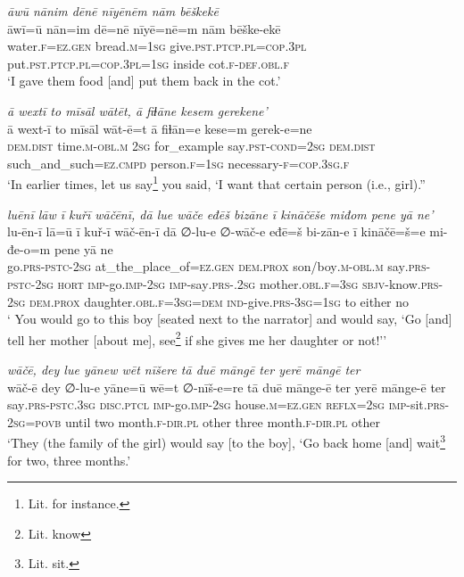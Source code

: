 \ea \label{ŽE.67}
\textit{āwū nānim dēnē nīyēnēm nām bēškekē} \\ 
\gll āwī=ū nān=im dē=nē nīyē=nē=m nām bēške-ekē \\ 
 water\textsc{.f}\textsc{\textsc{=ez.gen}} bread\textsc{.m}\textsc{=\textsc{1sg}} give\textsc{.pst}\textsc{.ptcp}\textsc{.pl}\textsc{=cop}\textsc{.3pl} put\textsc{.pst}\textsc{.ptcp}\textsc{.pl}\textsc{=cop}\textsc{.3pl}\textsc{=\textsc{1sg}} inside cot\textsc{.f}\textsc{-def}\textsc{.obl}\textsc{.f} \\ 
\glt `I gave them food [and] put them back in the cot.'
\z 
 
\ea \label{ŽE.73}
\textit{ā wextī to mīsāl wātēt, ā fiɫāne kesem gerekene’} \\ 
\gll ā wext-ī to mīsāl wāt-ē=t ā fiɫān=e kese=m gerek-e=ne \\ 
 \textsc{dem.dist} time\textsc{.m}\textsc{-obl}\textsc{.m} \textsc{2sg} for\_example say\textsc{.pst}\textsc{-cond}\textsc{=\textsc{2sg}} \textsc{dem.dist} such\_and\_such\textsc{=ez}\textsc{.cmpd} person\textsc{.f}\textsc{=\textsc{1sg}} necessary\textsc{-f}\textsc{=cop}\textsc{.3sg}\textsc{.f} \\ 
\glt `In earlier times, let us say\footnote{Lit. for instance.} you said, ‘I want that certain person (i.e., girl).''
\z 
 
\ea \label{ŽE.74}
\textit{luēnī lāw ī kuřī wāčēnī, dā lue wāče eđēš bizāne ī kināčēše miđom pene yā ne’} \\ 
\gll lu-ēn-ī lā=ū ī kuř-ī wāč-ēn-ī dā ∅-lu-e ∅-wāč-e eđē=š bi-zān-e ī kināčē=š=e mi-đe-o=m pene yā ne \\ 
 go\textsc{.prs}\textsc{-pstc}-\textsc{2sg} at\_the\_place\_of\textsc{\textsc{=ez.gen}} \textsc{dem.prox} son/boy\textsc{.m}\textsc{-obl}\textsc{.m} say\textsc{.prs}\textsc{-pstc}-\textsc{2sg} \textsc{hort} \textsc{imp-}go.\textsc{imp-}\textsc{2sg} \textsc{imp-}say\textsc{.prs-}.\textsc{2sg} mother\textsc{.obl}\textsc{.f}\textsc{=3sg} \textsc{sbjv-}know\textsc{.prs}-\textsc{2sg} \textsc{dem.prox} daughter\textsc{.obl}\textsc{.f}\textsc{=3sg}\textsc{=dem} \textsc{ind-}give\textsc{.prs}\textsc{-3sg}\textsc{=\textsc{1sg}} to either no \\ 
\glt ` You would go to this boy [seated next to the narrator] and would say, ‘Go [and] tell her mother [about me], see\footnote{Lit. know} if she gives me her daughter or not!’'
\z 
 
\ea \label{ŽE.82}
\textit{wāčē, dey lue yānew wēt nīšere tā duē māngē ter yerē māngē ter} \\ 
\gll wāč-ē dey ∅-lu-e yāne=ū wē=t ∅-nīš-e=re tā duē mānge-ē ter yerē mānge-ē ter \\ 
 say\textsc{.prs-pstc}\textsc{.3sg} \textsc{disc}.\textsc{ptcl} \textsc{imp-}go.\textsc{imp-}\textsc{2sg} house\textsc{.m}\textsc{\textsc{=ez.gen}} \textsc{reflx}\textsc{=\textsc{2sg}} \textsc{imp-}sit\textsc{.prs}-\textsc{2sg}\textsc{=\textsc{povb}} until two month\textsc{.f}\textsc{-dir}\textsc{.pl} other three month\textsc{.f}\textsc{-dir}\textsc{.pl} other \\ 
\glt `They (the family of the girl) would say [to the boy], ‘Go back home [and] wait\footnote{Lit. sit.} for two, three months.'
\z 
 
